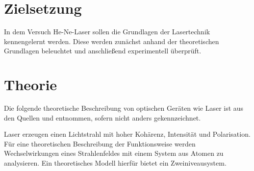 \section{Zielsetzung}
\label{sec:Zielsetzung}

In dem Versuch He-Ne-Laser sollen die Grundlagen der Lasertechnik kennengelernt
werden. Diese werden zunächst anhand der theoretischen Grundlagen beleuchtet und
anschließend experimentell überprüft.

\section{Theorie}
\label{sec:Theorie}
Die folgende theoretische Beschreibung von optischen Geräten wie Laser ist aus den Quellen
\cite{anleitung} und \cite{eichler} entnommen,
sofern nicht anders gekennzeichnet.

Laser erzeugen einen
Lichtstrahl mit hoher Kohärenz, Intensität und Polarisation. Für eine theoretischen
Beschreibung der Funktionsweise werden Wechselwirkungen eines Strahlenfeldes mit einem
System aus Atomen zu analysieren. Ein theoretisches Modell hierfür bietet ein
Zweiniveausystem.

